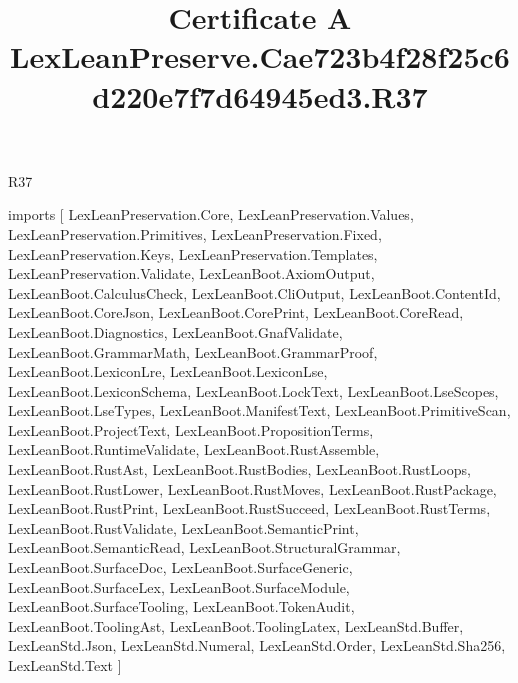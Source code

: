 \begin{lexlean}{R37}
\title{Certificate A LexLeanPreserve.Cae723b4f28f25c6d220e7f7d64945ed3.R37}
\begin{coremodule}
imports [
  LexLeanPreservation.Core,
  LexLeanPreservation.Values,
  LexLeanPreservation.Primitives,
  LexLeanPreservation.Fixed,
  LexLeanPreservation.Keys,
  LexLeanPreservation.Templates,
  LexLeanPreservation.Validate,
  LexLeanBoot.AxiomOutput,
  LexLeanBoot.CalculusCheck,
  LexLeanBoot.CliOutput,
  LexLeanBoot.ContentId,
  LexLeanBoot.CoreJson,
  LexLeanBoot.CorePrint,
  LexLeanBoot.CoreRead,
  LexLeanBoot.Diagnostics,
  LexLeanBoot.GnafValidate,
  LexLeanBoot.GrammarMath,
  LexLeanBoot.GrammarProof,
  LexLeanBoot.LexiconLre,
  LexLeanBoot.LexiconLse,
  LexLeanBoot.LexiconSchema,
  LexLeanBoot.LockText,
  LexLeanBoot.LseScopes,
  LexLeanBoot.LseTypes,
  LexLeanBoot.ManifestText,
  LexLeanBoot.PrimitiveScan,
  LexLeanBoot.ProjectText,
  LexLeanBoot.PropositionTerms,
  LexLeanBoot.RuntimeValidate,
  LexLeanBoot.RustAssemble,
  LexLeanBoot.RustAst,
  LexLeanBoot.RustBodies,
  LexLeanBoot.RustLoops,
  LexLeanBoot.RustLower,
  LexLeanBoot.RustMoves,
  LexLeanBoot.RustPackage,
  LexLeanBoot.RustPrint,
  LexLeanBoot.RustSucceed,
  LexLeanBoot.RustTerms,
  LexLeanBoot.RustValidate,
  LexLeanBoot.SemanticPrint,
  LexLeanBoot.SemanticRead,
  LexLeanBoot.StructuralGrammar,
  LexLeanBoot.SurfaceDoc,
  LexLeanBoot.SurfaceGeneric,
  LexLeanBoot.SurfaceLex,
  LexLeanBoot.SurfaceModule,
  LexLeanBoot.SurfaceTooling,
  LexLeanBoot.TokenAudit,
  LexLeanBoot.ToolingAst,
  LexLeanBoot.ToolingLatex,
  LexLeanStd.Buffer,
  LexLeanStd.Json,
  LexLeanStd.Numeral,
  LexLeanStd.Order,
  LexLeanStd.Sha256,
  LexLeanStd.Text
]


\end{coremodule}
\end{lexlean}
